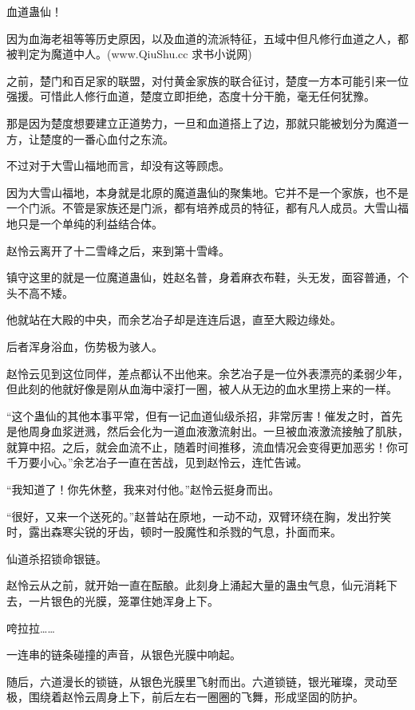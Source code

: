 
\begin{this_body}

血道蛊仙！

因为血海老祖等等历史原因，以及血道的流派特征，五域中但凡修行血道之人，都被判定为魔道中人。(www.QiuShu.cc 求书小说网)

之前，楚门和百足家的联盟，对付黄金家族的联合征讨，楚度一方本可能引来一位强援。可惜此人修行血道，楚度立即拒绝，态度十分干脆，毫无任何犹豫。

那是因为楚度想要建立正道势力，一旦和血道搭上了边，那就只能被划分为魔道一方，让楚度的一番心血付之东流。

不过对于大雪山福地而言，却没有这等顾虑。

因为大雪山福地，本身就是北原的魔道蛊仙的聚集地。它并不是一个家族，也不是一个门派。不管是家族还是门派，都有培养成员的特征，都有凡人成员。大雪山福地只是一个单纯的利益结合体。

赵怜云离开了十二雪峰之后，来到第十雪峰。

镇守这里的就是一位魔道蛊仙，姓赵名普，身着麻衣布鞋，头无发，面容普通，个头不高不矮。

他就站在大殿的中央，而余艺冶子却是连连后退，直至大殿边缘处。

后者浑身浴血，伤势极为骇人。

赵怜云见到这位同伴，差点都认不出他来。余艺冶子是一位外表漂亮的柔弱少年，但此刻的他就好像是刚从血海中滚打一圈，被人从无边的血水里捞上来的一样。

“这个蛊仙的其他本事平常，但有一记血道仙级杀招，非常厉害！催发之时，首先是他周身血浆迸溅，然后会化为一道血液激流射出。一旦被血液激流接触了肌肤，就算中招。之后，就会血流不止，随着时间推移，流血情况会变得更加恶劣！你可千万要小心。”余艺冶子一直在苦战，见到赵怜云，连忙告诫。

“我知道了！你先休整，我来对付他。”赵怜云挺身而出。

“很好，又来一个送死的。”赵普站在原地，一动不动，双臂环绕在胸，发出狞笑时，露出森寒尖锐的牙齿，顿时一股魔性和杀戮的气息，扑面而来。

仙道杀招锁命银链。

赵怜云从之前，就开始一直在酝酿。此刻身上涌起大量的蛊虫气息，仙元消耗下去，一片银色的光膜，笼罩住她浑身上下。

咵拉拉……

一连串的链条碰撞的声音，从银色光膜中响起。

随后，六道漫长的锁链，从银色光膜里飞射而出。六道锁链，银光璀璨，灵动至极，围绕着赵怜云周身上下，前后左右一圈圈的飞舞，形成坚固的防护。


\end{this_body}
